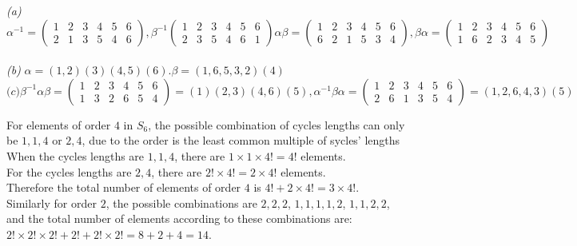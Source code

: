 \documentclass[11pt]{article}
\newenvironment{problem}[2][Problem]{\begin{trivlist}
\item[\hskip \labelsep {\bfseries #1}\hskip \labelsep {\bfseries #2.}]}{\end{trivlist}}
\begin{document}
\begin{problem}{(2)}
\textit{(a)} \[ \alpha^{-1} =  \begin{pmatrix} 1&2&3&4&5&6 \\ 2&1&3&5&4&6  \end{pmatrix} , \beta^{-1} \begin{pmatrix} 1&2&3&4&5&6 \\ 2&3&5&4&6&1  \end{pmatrix}
\alpha \beta = \begin{pmatrix} 1&2&3&4&5&6 \\ 6&2&1&5&3&4\end{pmatrix}, \beta \alpha = \begin{pmatrix} 1&2&3&4&5&6 \\ 1&6&2&3&4&5 \end{pmatrix}\]\\
\textit{(b)} $\alpha = (1,2)(3)(4,5)(6). \beta = (1,6,5,3,2)(4)$\\
\[ \textit{(c)} \beta^{-1} \alpha \beta = \begin{pmatrix} 1&2&3&4&5&6\\ 1&3&2&6&5&4 \end{pmatrix} = (1)(2,3)(4,6)(5), \alpha^{-1}\beta \alpha = 
\begin{pmatrix} 1&2&3&4&5&6 \\ 2&6&1&3&5&4 \end{pmatrix} = (1,2,6,4,3)(5) \]
\end{problem}
\begin{problem}{(3)}
For elements of order $4$ in $S_6$, the possible combination of cycles lengths can only be $1,1,4$ or $2,4$, due to the order is the least common multiple
of sycles' lengths\\
When the cycles lengths are $1,1,4$, there are $1\times 1 \times 4! = 4!$ elements. \\
For the cycles lengths are $2,4$, there are $2! \times 4! = 2 \times 4!$ elements.\\
Therefore the total number of elements of order $4$ is $4!+2\times 4! = 3\times 4!$.\\
Similarly for order $2$, the possible combinations are $2,2,2$, $1,1,1,1,2$, $1,1,2,2$, and the total number of elements according to these combinations are:\\
$2!\times 2! \times 2! + 2! + 2!\times 2! = 8+2+4 = 14$.\\
\end{problem}
\end{document}
